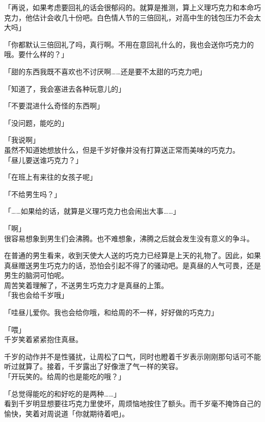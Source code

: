 「再说，如果考虑要回礼的话会很郁闷的。就算是推测，算上义理巧克力和本命巧克力，他估计会收几十份吧。白色情人节的三倍回礼，对高中生的钱包压力不会太大吗」

「你都默认三倍回礼了吗，真行啊。不用在意回礼什么的，我也会送你巧克力的哦。要什么样的？」

「甜的东西我既不喜欢也不讨厌啊……还是要不太甜的巧克力吧」

「知道了，我会塞进去各种玩意儿的」

「不要混进什么奇怪的东西啊」

「没问题，能吃的」

「我说啊」\\

虽然不知道她想放什么，但是千岁好像并没有打算送正常而美味的巧克力。\\

「昼儿要送谁巧克力？」

「在班上有来往的女孩子呢」

「不给男生吗？」

「……如果给的话，就算是义理巧克力也会闹出大事……」

「啊」\\

很容易想象到男生们会沸腾。也不难想象，沸腾之后就会发生没有意义的争斗。

在普通的男生看来，收到天使大人送的巧克力已经算是上天的礼物了。因此，如果真昼赠送男生巧克力的话，恐怕会引起不得了的骚动吧。是真昼的人气可畏，还是男生的脑洞可怕呢。\\

周苦笑着理解了，不送男生巧克力才是真昼的上策。\\

「我也会给千岁哦」

「哇昼儿爱你。我也会给你哦，和给周的不一样，好好做的巧克力」

「喂」\\

千岁笑着紧紧抱住真昼。

千岁的动作并不是性骚扰，让周松了口气，同时也瞪着千岁表示刚刚那句话可不能听过就算了。接着，千岁露出了好像泄了气一样的笑容。\\

「开玩笑的。给周的也是能吃的哦？」

「总觉得能吃的和好吃的是两种……」\\

看到千岁明显想要往巧克力里使坏，周烦恼地按住了额头。而千岁毫不掩饰自己的愉快，笑着对周说道「你就期待着吧」。
